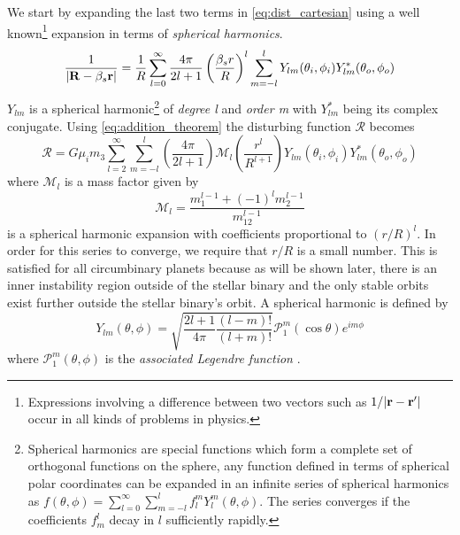 We start by expanding the last two terms in \cref{eq:dist_cartesian} using 
a well known\footnote{Expressions involving a difference between two vectors 
such as $1/\lvert \boldsymbol{\mathbf{r}}-\boldsymbol{\mathbf{r}}'\rvert$ occur in all kinds of problems 
in physics.} expansion in terms of \emph{spherical harmonics}. 
\begin{equation}
    \frac{1}{\lvert \boldsymbol{\mathbf{R}} -\beta_s\boldsymbol{\mathbf{r}}\rvert}= \frac{1}{R} \sum^\infty_{l=0}
  \frac{4\pi}{2l+1}   \left( \frac{\beta_s r}{R} \right)^l
    \sum^l_{m=-l} Y_{lm}(\theta_i,\phi_i)
    Y_{lm}^*(\theta_o,\phi_o)
    \label{eq:addition_theorem}
\end{equation}
$Y_{lm}$ is a spherical harmonic\footnote{Spherical harmonics are special
functions which form a complete set of orthogonal functions on the sphere, 
any function defined in terms of spherical polar coordinates can be expanded
in an infinite series of spherical harmonics as $f(\theta,\phi)
=\sum^\infty_{l=0}\sum^l_{m=-l}f^m_lY_l^m(\theta,\phi)$. The series converges 
if the coefficients $f^l_m$ decay in $l$ sufficiently rapidly.} of
\emph{degree l} and \emph{order m} with
$Y_{lm}^*$ being its complex conjugate. Using 
\cref{eq:addition_theorem} the disturbing function $\mathcal{R}$ becomes
\begin{equation}
    \mathcal{R}=G\mu_im_3\sum^\infty_{l=2}\sum^l_{m=-l}\left( \frac{4\pi}{2l+1} 
    \right)\mathcal{M}_l\left( \frac{r^l}{R^{l+1}} \right) Y_{lm}(\theta_i,\phi_i)
    Y_{lm}^*(\theta_o,\phi_o)
\label{eq:dist_harmonics}
\end{equation}
where $\mathcal{M}_l$ is a mass factor given by
\begin{equation}
    \mathcal{M}_l= \frac{m_1^{l-1}+(-1)^lm_2^{l-1}}{m_{12}^{l-1}} 
\end{equation}
 is a spherical harmonic expansion with 
coefficients proportional to $(r/R)^l$. In order for this series
to converge, we require that $r/R$ is a small number. This is satisfied
for all circumbinary planets because as will be shown later, there is
an inner instability region outside of the stellar binary and the only
stable orbits exist further outside the stellar binary's orbit. A spherical
harmonic is defined by
\begin{equation}
    Y_{lm}(\theta,\phi)=\sqrt{ \frac{2l+1}{4\pi} \frac{(l-m)!}{(l+m)!} }\mathcal{P}_1^m(
    \cos\theta)e^{im\phi}
    \label{eq:sph_harmonics}
\end{equation}
where $\mathcal{P}_1^m(\theta, \phi)$ is the \emph{associated Legendre function}
\citep{jackson}. 

